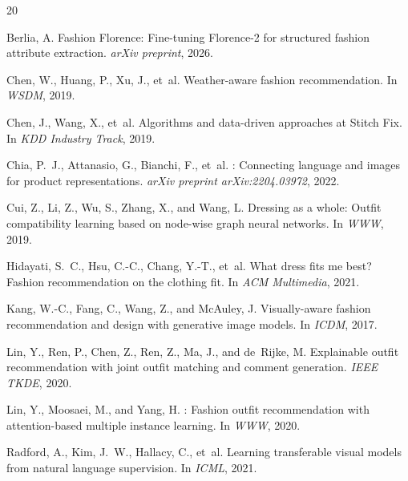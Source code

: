 \documentclass[10pt,twocolumn]{article}
\begin{document}

\begin{thebibliography}{20}

Berlia, A.
\newblock Fashion {Florence}: Fine-tuning {Florence-2} for structured fashion
attribute extraction.
\newblock \emph{arXiv preprint}, 2026.

Chen, W., Huang, P., Xu, J., et~al.
\newblock Weather-aware fashion recommendation.
\newblock In \emph{WSDM}, 2019.

Chen, J., Wang, X., et~al.
\newblock Algorithms and data-driven approaches at {Stitch Fix}.
\newblock In \emph{KDD Industry Track}, 2019.

Chia, P.~J., Attanasio, G., Bianchi, F., et~al.
: Connecting language and images for product
representations.
\newblock \emph{arXiv preprint arXiv:2204.03972}, 2022.

Cui, Z., Li, Z., Wu, S., Zhang, X., and Wang, L.
\newblock Dressing as a whole: Outfit compatibility learning based on node-wise
graph neural networks.
\newblock In \emph{WWW}, 2019.

Hidayati, S.~C., Hsu, C.-C., Chang, Y.-T., et~al.
\newblock What dress fits me best? Fashion recommendation on the clothing
fit.
\newblock In \emph{ACM Multimedia}, 2021.

Kang, W.-C., Fang, C., Wang, Z., and McAuley, J.
\newblock Visually-aware fashion recommendation and design with generative
image models.
\newblock In \emph{ICDM}, 2017.

Lin, Y., Ren, P., Chen, Z., Ren, Z., Ma, J., and de~Rijke, M.
\newblock Explainable outfit recommendation with joint outfit matching and
comment generation.
\newblock \emph{IEEE TKDE}, 2020.

Lin, Y., Moosaei, M., and Yang, H.
: Fashion outfit recommendation with attention-based
multiple instance learning.
\newblock In \emph{WWW}, 2020.

Radford, A., Kim, J.~W., Hallacy, C., et~al.
\newblock Learning transferable visual models from natural language
supervision.
\newblock In \emph{ICML}, 2021.


\end{thebibliography}
\end{document}
